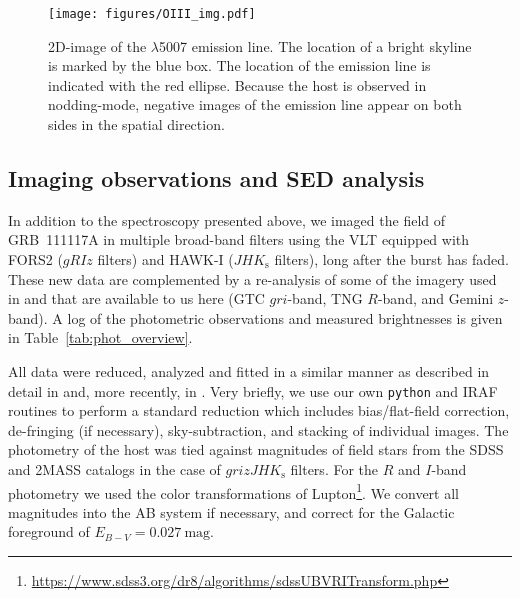 \documentclass{aa}    %
\begin{document}

\begin{figure}
	\centering
	\texttt{[image: figures/OIII\_img.pdf]}
	\caption{2D-image of the \oiii$\lambda$5007 emission line. The location of a bright skyline is marked by the blue box. The location of the emission line is indicated with the red ellipse. Because the host is observed in nodding-mode, negative images of the emission line appear on both sides in the spatial direction.}
	\label{fig:line}
\end{figure}



\subsection{Imaging observations and SED analysis} \label{SED}

In addition to the spectroscopy presented above, we imaged the field of GRB~111117A 
in multiple broad-band filters using the VLT equipped with FORS2 ($gRIz$ filters) and HAWK-I
($JHK_{\mathrm{s}}$ filters), long after the burst has faded. These new data are
complemented by a re-analysis of some of the imagery used in
\citet{Margutti2012} and \citet{Sakamoto2013} that are available to us here (GTC
$gri$-band, TNG $R$-band, and Gemini $z$-band). A log of the photometric
observations and measured brightnesses is given in Table~\ref{tab:phot_overview}.

All data were reduced, analyzed and fitted in a similar manner as described in detail in
\citet{Kruhler2011a} and, more recently, in \citet{Schulze2016}. Very briefly, we use our own
\texttt{python} and IRAF routines to perform a standard reduction which includes
bias/flat-field correction, de-fringing (if necessary), sky-subtraction, and
stacking of individual images. The photometry of the host was tied against magnitudes 
of field stars from the SDSS and 2MASS catalogs in the case of $grizJHK_{\mathrm{s}}$ filters. 
For the $R$ and $I$-band photometry we used the color transformations of
Lupton\footnote{\url{https://www.sdss3.org/dr8/algorithms/sdssUBVRITransform.php}}. 
We convert all magnitudes into the AB system if necessary, and correct for the Galactic 
foreground of $E_{B-V}=0.027~\mathrm{mag}$.
\end{document}
